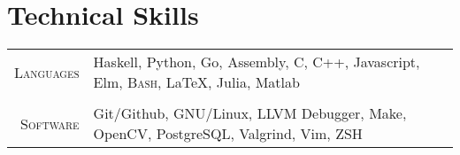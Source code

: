 \documentclass[a4paper,10pt]{article}
\newcommand{\br}{\\\multicolumn{2}{c}{}}
\begin{document}
\section{Technical Skills}
\begin{tabular}{r|p{15cm}}
    \textsc{\small Languages} &
    Haskell,
    Python,
    Go,
    Assembly,
    C,
    C++,
    Javascript,
    Elm,
    \textsc{Bash},
    \LaTeX{},
    Julia,
    Matlab \br\\

    \textsc{\small Software} &
    Git/Github,
    GNU/Linux,
    LLVM Debugger,
    Make,
    OpenCV,
    PostgreSQL,
    Valgrind,
    Vim,
    ZSH
\end{tabular}
\end{document}
